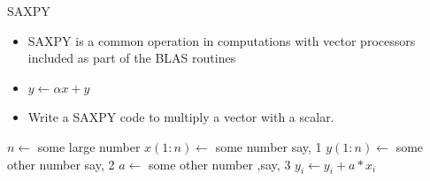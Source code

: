 \documentclass[c,mathserif,compress,xcolor=svgnames]{beamer}
\begin{document}
\begin{frame}{\small SAXPY}
  \begin{itemize}
    \item SAXPY is a common operation in computations with vector processors included as part of the BLAS routines
    \item[] $y\leftarrow \alpha x + y$
    \item Write a SAXPY code to multiply a vector with a scalar.
  \end{itemize}
  \begin{algorithm}[H]
    \caption{Pseudo Code for SAXPY}
    \begin{algorithmic}
      \State $n \gets$ some large number
      \State $x(1:n) \gets$ some number say, 1
      \State $y(1:n) \gets$ some other number say, 2
      \State $a \gets$ some other number ,say, 3
      \State $y_i \gets y_i + a * x_i$
      \EndDo
    \end{algorithmic}
  \end{algorithm}
\end{frame}
\end{document}
